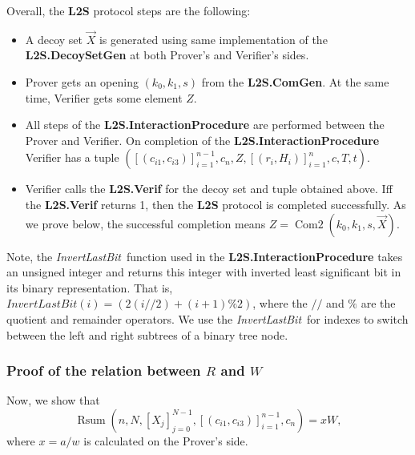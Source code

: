 \documentclass{mathcryptology} %
\DeclareMathOperator{\Rsum}{Rsum}
\DeclareMathOperator{\ComTwo}{Com2}
\newcommand{\InvertLastBit}{\textit{InvertLastBit}}
\theoremstyle{title}
\theoremstyle{titleof}
\begin{document}
    Overall, the \textbf{L2S} protocol steps are the following:
    \begin{itemize}
        \item A decoy set $\vec{X}$ is generated using same implementation of the \textbf{L2S.DecoySetGen} at both Prover's and Verifier's sides.
        \item Prover gets an opening $\left(k_{0}, k_{1}, s\right)$ from the \textbf{L2S.ComGen}. At the same time, Verifier gets some element $Z$.
        \item All steps of the \textbf{L2S.InteractionProcedure} are performed between the Prover and Verifier. On completion of the \textbf{L2S.InteractionProcedure} Verifier has a tuple $\left({\left[\left(c_{i1}, c_{i3}\right)\right]}_{i=1}^{n-1}, c_{n}, Z, {\left[\left(r_{i}, H_{i}\right)\right]}_{i=1}^n, c, T, t\right)$.
        \item Verifier calls the \textbf{L2S.Verif} for the decoy set and tuple obtained above. Iff the \textbf{L2S.Verif} returns 1, then the \textbf{L2S} protocol is completed successfully. As we prove below, the successful completion means $Z=\ComTwo\left(k_{0}, k_{1}, s, \vec{X}\right)$.
    \end{itemize}
    Note, the \InvertLastBit\ function used in the \textbf{L2S.InteractionProcedure} takes an unsigned integer and returns this integer with inverted least significant bit in its binary representation. That is, $\InvertLastBit\left(i\right)=\left(2\left(i//2\right)+\left(i+1\right)\%2\right)$, where the $//$ and $\%$ are the quotient and remainder operators. We use the \InvertLastBit\ for indexes to switch between the left and right subtrees of a binary tree node.


\subsubsection{Proof of the relation between $R$ and $W$}\label{Sec:6.2.1.}
    Now, we show that
    \begin{equation*}{
        \Rsum\left(n, N, {\left[X_{j}\right]}_{j=0}^{N-1}, {\left[\left(c_{i1}, c_{i3}\right)\right]}_{i=1}^{n-1}, c_{n}\right)=xW,} 
    \end{equation*}
    where $x=a/w$ is calculated on the Prover's side.
    
\end{document}
